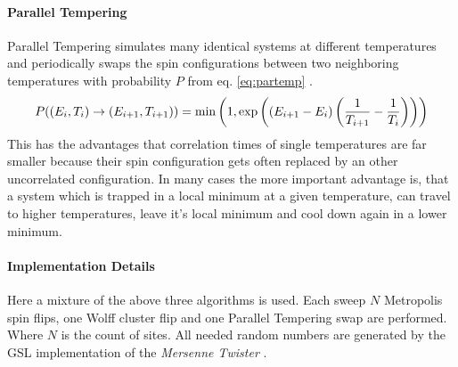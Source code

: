     \paragraph{Parallel Tempering}
        Parallel Tempering simulates many identical systems at different
        temperatures and periodically swaps the spin configurations
        between two neighboring temperatures with probability \(P\) from
        eq. \eqref{eq:partemp} \cite[S. ??]{NewmanBarkema1999} \cite[S. 155ff]{Katzgraber2011}.
        \begin{equation}
            P((E_i,T_i) \to (E_{i+1},T_{i+1})) = \min\left(1,\exp\left(\left(E_{i+1}-E_i\right)\left(\frac{1}{T_{i+1}}-\frac{1}{T_i}\right)\right)\right)
            \label{eq:partemp}
        \end{equation}
        This has the advantages that correlation times of single
        temperatures are far smaller because their spin configuration
        gets often replaced by an other uncorrelated configuration. In
        many cases the more important advantage is, that a system which
        is trapped in a local minimum at a given temperature, can travel
        to higher temperatures, leave it's local minimum and cool down
        again in a lower minimum.

    \paragraph{Implementation Details}
        Here a mixture of the above three algorithms is used.
        Each sweep \(N\) Metropolis spin flips, one Wolff cluster flip
        and one Parallel Tempering swap are performed. Where \(N\) is the
        count of sites. All needed random numbers are generated by the
        GSL \cite{GSL} implementation of the \emph{Mersenne Twister} \cite{Matsumoto1998}.


